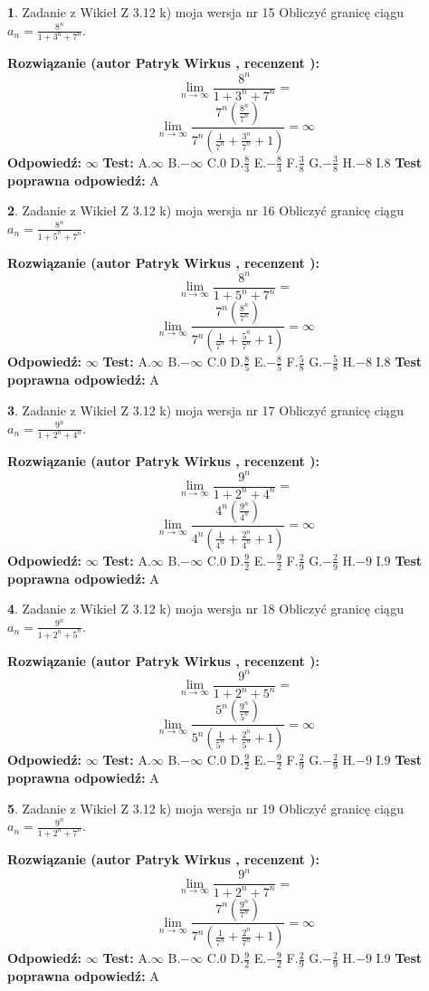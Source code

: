 \documentclass[12pt, a4paper]{article}
\theoremstyle{definition} %
\newtheorem{zad}{}
\newcommand{\zadStart}[1]{\begin{zad}#1\newline}
\newcommand{\zadStop}{\end{zad}}
\newcommand{\rozwStart}[2]{\noindent \textbf{Rozwiązanie (autor #1 , recenzent #2): }\newline}
\newcommand{\rozwStop}{\newline}
\newcommand{\odpStart}{\noindent \textbf{Odpowiedź:}\newline}
\newcommand{\odpStop}{\newline}
\newcommand{\testStart}{\noindent \textbf{Test:}\newline}
\newcommand{\testStop}{\newline}
\newcommand{\kluczStart}{\noindent \textbf{Test poprawna odpowiedź:}\newline}
\newcommand{\kluczStop}{\newline}
\begin{document}
\zadStart{Zadanie z Wikieł Z 3.12 k) moja wersja nr 15}
Obliczyć granicę ciągu $a_{n}=\frac{8^{n}}{1+3^{n} + 7^{n}}$.
\zadStop
\rozwStart{Patryk Wirkus}{}
$$\lim\limits_{n\to\infty}\frac{8^{n}}{1+3^{n} + 7^{n}}=$$
$$\lim\limits_{n\to\infty}\frac{7^{n}(\frac{8^{n}}{7^{n}} )}{7^{n}(\frac{1}{7^{n}}+\frac{3^{n}}{7^{n}}+1)} = \infty$$
\rozwStop
\odpStart
$\infty$
\odpStop
\testStart
A.$\infty$
B.$-\infty$
C.$0$
D.$\frac{8}{3}$
E.$-\frac{8}{3}$
F.$\frac{3}{8}$
G.$-\frac{3}{8}$
H.$-8$
I.$8$
\testStop
\kluczStart
A
\kluczStop



\zadStart{Zadanie z Wikieł Z 3.12 k) moja wersja nr 16}
Obliczyć granicę ciągu $a_{n}=\frac{8^{n}}{1+5^{n} + 7^{n}}$.
\zadStop
\rozwStart{Patryk Wirkus}{}
$$\lim\limits_{n\to\infty}\frac{8^{n}}{1+5^{n} + 7^{n}}=$$
$$\lim\limits_{n\to\infty}\frac{7^{n}(\frac{8^{n}}{7^{n}} )}{7^{n}(\frac{1}{7^{n}}+\frac{5^{n}}{7^{n}}+1)} = \infty$$
\rozwStop
\odpStart
$\infty$
\odpStop
\testStart
A.$\infty$
B.$-\infty$
C.$0$
D.$\frac{8}{5}$
E.$-\frac{8}{5}$
F.$\frac{5}{8}$
G.$-\frac{5}{8}$
H.$-8$
I.$8$
\testStop
\kluczStart
A
\kluczStop



\zadStart{Zadanie z Wikieł Z 3.12 k) moja wersja nr 17}
Obliczyć granicę ciągu $a_{n}=\frac{9^{n}}{1+2^{n} + 4^{n}}$.
\zadStop
\rozwStart{Patryk Wirkus}{}
$$\lim\limits_{n\to\infty}\frac{9^{n}}{1+2^{n} + 4^{n}}=$$
$$\lim\limits_{n\to\infty}\frac{4^{n}(\frac{9^{n}}{4^{n}} )}{4^{n}(\frac{1}{4^{n}}+\frac{2^{n}}{4^{n}}+1)} = \infty$$
\rozwStop
\odpStart
$\infty$
\odpStop
\testStart
A.$\infty$
B.$-\infty$
C.$0$
D.$\frac{9}{2}$
E.$-\frac{9}{2}$
F.$\frac{2}{9}$
G.$-\frac{2}{9}$
H.$-9$
I.$9$
\testStop
\kluczStart
A
\kluczStop



\zadStart{Zadanie z Wikieł Z 3.12 k) moja wersja nr 18}
Obliczyć granicę ciągu $a_{n}=\frac{9^{n}}{1+2^{n} + 5^{n}}$.
\zadStop
\rozwStart{Patryk Wirkus}{}
$$\lim\limits_{n\to\infty}\frac{9^{n}}{1+2^{n} + 5^{n}}=$$
$$\lim\limits_{n\to\infty}\frac{5^{n}(\frac{9^{n}}{5^{n}} )}{5^{n}(\frac{1}{5^{n}}+\frac{2^{n}}{5^{n}}+1)} = \infty$$
\rozwStop
\odpStart
$\infty$
\odpStop
\testStart
A.$\infty$
B.$-\infty$
C.$0$
D.$\frac{9}{2}$
E.$-\frac{9}{2}$
F.$\frac{2}{9}$
G.$-\frac{2}{9}$
H.$-9$
I.$9$
\testStop
\kluczStart
A
\kluczStop



\zadStart{Zadanie z Wikieł Z 3.12 k) moja wersja nr 19}
Obliczyć granicę ciągu $a_{n}=\frac{9^{n}}{1+2^{n} + 7^{n}}$.
\zadStop
\rozwStart{Patryk Wirkus}{}
$$\lim\limits_{n\to\infty}\frac{9^{n}}{1+2^{n} + 7^{n}}=$$
$$\lim\limits_{n\to\infty}\frac{7^{n}(\frac{9^{n}}{7^{n}} )}{7^{n}(\frac{1}{7^{n}}+\frac{2^{n}}{7^{n}}+1)} = \infty$$
\rozwStop
\odpStart
$\infty$
\odpStop
\testStart
A.$\infty$
B.$-\infty$
C.$0$
D.$\frac{9}{2}$
E.$-\frac{9}{2}$
F.$\frac{2}{9}$
G.$-\frac{2}{9}$
H.$-9$
I.$9$
\testStop
\kluczStart
A
\kluczStop
\end{document}
